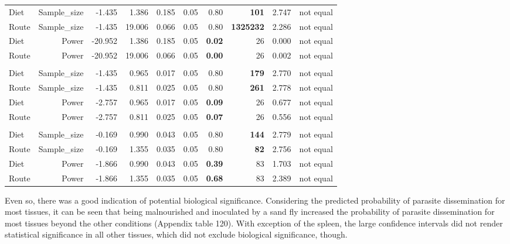 \documentclass[
  12pt,
  letterpaper,
]{article}
\begin{document}
\begin{longtable}{l|rrrrrrrrr}
\midrule\addlinespace[2.5pt]
Diet & Sample\_size & -1.435 & 1.386 & 0.185 & 0.05 & 0.80 & {\bfseries 101} & 2.747 & not equal \\ 
Route & Sample\_size & -1.435 & 19.006 & 0.066 & 0.05 & 0.80 & {\bfseries 1325232} & 2.286 & not equal \\ 
Diet & Power & -20.952 & 1.386 & 0.185 & 0.05 & {\bfseries 0.02} & 26 & 0.000 & not equal \\ 
Route & Power & -20.952 & 19.006 & 0.066 & 0.05 & {\bfseries 0.00} & 26 & 0.002 & not equal \\ 
\midrule\addlinespace[2.5pt]
\multicolumn{10}{l}{Paw} \\[2.5pt] 
\midrule\addlinespace[2.5pt]
Diet & Sample\_size & -1.435 & 0.965 & 0.017 & 0.05 & 0.80 & {\bfseries 179} & 2.770 & not equal \\ 
Route & Sample\_size & -1.435 & 0.811 & 0.025 & 0.05 & 0.80 & {\bfseries 261} & 2.778 & not equal \\ 
Diet & Power & -2.757 & 0.965 & 0.017 & 0.05 & {\bfseries 0.09} & 26 & 0.677 & not equal \\ 
Route & Power & -2.757 & 0.811 & 0.025 & 0.05 & {\bfseries 0.07} & 26 & 0.556 & not equal \\ 
\midrule\addlinespace[2.5pt]
\multicolumn{10}{l}{Spleen} \\[2.5pt] 
\midrule\addlinespace[2.5pt]
Diet & Sample\_size & -0.169 & 0.990 & 0.043 & 0.05 & 0.80 & {\bfseries 144} & 2.779 & not equal \\ 
Route & Sample\_size & -0.169 & 1.355 & 0.035 & 0.05 & 0.80 & {\bfseries 82} & 2.756 & not equal \\ 
Diet & Power & -1.866 & 0.990 & 0.043 & 0.05 & {\bfseries 0.39} & 83 & 1.703 & not equal \\ 
Route & Power & -1.866 & 1.355 & 0.035 & 0.05 & {\bfseries 0.68} & 83 & 2.389 & not equal \\ 
\bottomrule
\end{longtable}
\endgroup

Even so, there was a good indication of potential biological significance. Considering the predicted probability of parasite dissemination for most tissues, it can be seen that being malnourished and inoculated by a sand fly increased the probability of parasite dissemination for most tissues beyond the other conditions (Appendix table 120). With exception of the spleen, the large confidence intervals did not render statistical significance in all other tissues, which did not exclude biological significance, though.
\end{document}
